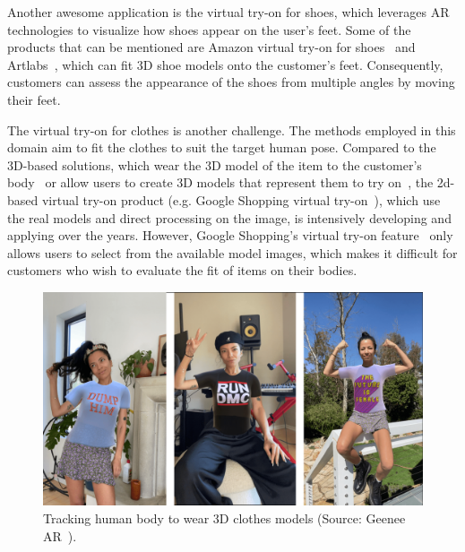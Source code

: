 Another awesome application is the virtual try-on for shoes, which leverages AR technologies to visualize how shoes appear on the user's feet. Some of the products that can be mentioned are Amazon virtual try-on for shoes~\cite{AmazonVTO-Aboutamazon2022-Shoes} and Artlabs~\cite{Artlabs-Shoes}, which can fit 3D shoe models onto the customer's feet. Consequently, customers can assess the appearance of the shoes from multiple angles by moving their feet.

The virtual try-on for clothes is another challenge. The methods employed in this domain aim to fit the clothes to suit the target human pose. Compared to the 3D-based solutions, which wear the 3D model of the item to the customer's body~\cite{GeeneeVTO-Clothes} or allow users to create 3D models that represent them to try on~\cite{ZalandoVTO-Zalando2023-Clothes}, the 2d-based virtual try-on product (e.g. Google Shopping virtual try-on~\cite{GoogleVTO-GoogleBlog2023-Clothes}), which use the real models and direct processing on the image, is intensively developing and applying over the years. However, Google Shopping's virtual try-on feature~\cite{GoogleVTO-GoogleBlog2023-Clothes} only allows users to select from the available model images, which makes it difficult for customers who wish to evaluate the fit of items on their bodies.

\begin{figure}[h!]
    \centering
    \includegraphics[width=\linewidth]{content/resources/images/literature-review/geenee-ar.png}
    \caption{Tracking human body to wear 3D clothes models (Source: Geenee AR~\cite{GeeneeVTO-Clothes}).}
    \label{fig:commercial-amazon}
\end{figure}

